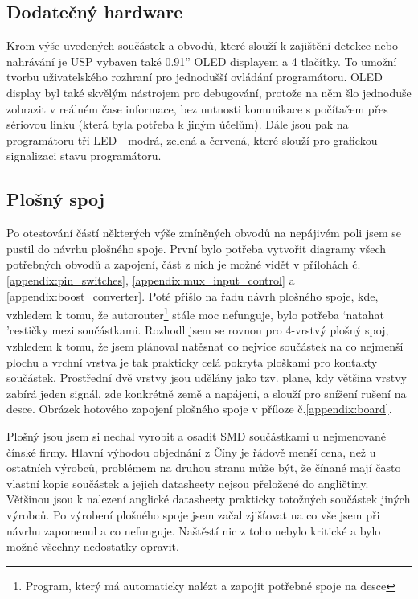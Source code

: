 \documentclass[11pt,a4paper,twoside,openright]{report}
\begin{document}
\subsection {Dodatečný hardware}

Krom výše uvedených součástek a obvodů, které slouží k zajištění detekce nebo nahrávání je USP vybaven také 0.91'' OLED displayem a 4 tlačítky. To umožní tvorbu uživatelského rozhraní pro jednodušší ovládání programátoru. OLED display byl také skvělým nástrojem pro debugování, protože na něm šlo jednoduše zobrazit v reálném čase informace, bez nutnosti komunikace s počítačem přes sériovou linku (která byla potřeba k jiným účelům). Dále jsou pak na programátoru tři LED - modrá, zelená a červená, které slouží pro grafickou signalizaci stavu programátoru.

\subsection {Plošný spoj}

Po otestování částí některých výše zmíněných obvodů na nepájivém poli jsem se pustil do návrhu plošného spoje. První bylo potřeba vytvořit diagramy všech potřebných obvodů a zapojení, část z nich je možné vidět v přílohách č. \ref{appendix:pin_switches}, \ref{appendix:mux_input_control} a \ref{appendix:boost_converter}. Poté přišlo na řadu návrh plošného spoje, kde, vzhledem k tomu, že autorouter\footnote{Program, který má automaticky nalézt a zapojit potřebné spoje na desce} stále moc nefunguje, bylo potřeba \lq natahat \rq cestičky mezi součástkami. Rozhodl jsem se rovnou pro 4-vrstvý plošný spoj, vzhledem k tomu, že jsem plánoval natěsnat co nejvíce součástek na co nejmenší plochu a vrchní vrstva je tak prakticky celá pokryta ploškami pro kontakty součástek. Prostřední dvě vrstvy jsou udělány jako tzv. plane, kdy většina vrstvy zabírá jeden signál, zde konkrétně země a napájení, a slouží pro snížení rušení na desce. Obrázek hotového zapojení plošného spoje v příloze č.\ref{appendix:board}.

Plošný jsou jsem si nechal vyrobit a osadit SMD součástkami u nejmenované čínské firmy. Hlavní výhodou objednání z Číny je řádově menší cena, než u ostatních výrobců, problémem na druhou stranu může být, že čínané mají často vlastní kopie součástek a jejich datasheety nejsou přeložené do angličtiny. Většinou jsou k nalezení anglické datasheety prakticky totožných součástek jiných výrobců. Po výrobení plošného spoje jsem začal zjišťovat na co vše jsem při návrhu zapomenul a co nefunguje. Naštěstí nic z toho nebylo kritické a bylo možné všechny nedostatky opravit.
\end{document}

